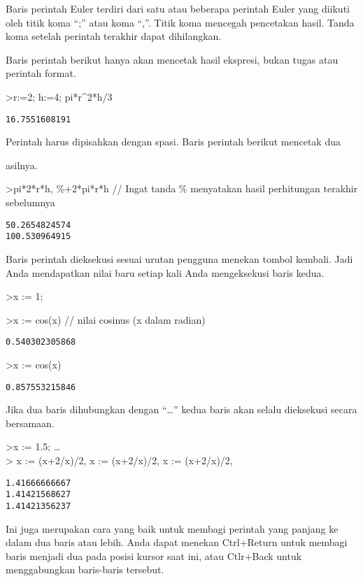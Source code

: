\documentclass[
]{book}
\begin{document}
Baris perintah Euler terdiri dari satu atau beberapa perintah Euler yang diikuti oleh titik koma ``;'' atau koma ``,''. Titik koma mencegah pencetakan hasil. Tanda koma setelah perintah terakhir dapat dihilangkan.

Baris perintah berikut hanya akan mencetak hasil ekspresi, bukan tugas atau perintah format.

\textgreater r:=2; h:=4; pi*r\^{}2*h/3

\begin{verbatim}
16.7551608191
\end{verbatim}

Perintah harus dipisahkan dengan spasi. Baris perintah berikut mencetak dua

asilnya.

\textgreater pi*2*r*h, \%+2*pi*r*h // Ingat tanda \% menyatakan hasil perhitungan terakhir sebelumnya

\begin{verbatim}
50.2654824574
100.530964915
\end{verbatim}

Baris perintah dieksekusi sesuai urutan pengguna menekan tombol kembali. Jadi Anda mendapatkan nilai baru setiap kali Anda mengeksekusi baris kedua.

\textgreater x := 1;

\textgreater x := cos(x) // nilai cosinus (x dalam radian)

\begin{verbatim}
0.540302305868
\end{verbatim}

\textgreater x := cos(x)

\begin{verbatim}
0.857553215846
\end{verbatim}

Jika dua baris dihubungkan dengan ``\ldots{}'' kedua baris akan selalu dieksekusi secara bersamaan.

\textgreater x := 1.5; \ldots{}\\
\textgreater{} x := (x+2/x)/2, x := (x+2/x)/2, x := (x+2/x)/2,

\begin{verbatim}
1.41666666667
1.41421568627
1.41421356237
\end{verbatim}

Ini juga merupakan cara yang baik untuk membagi perintah yang panjang ke dalam dua baris atau lebih. Anda dapat menekan Ctrl+Return untuk membagi baris menjadi dua pada posisi kursor saat ini, atau Ctlr+Back untuk menggabungkan baris-baris tersebut.
\end{document}
